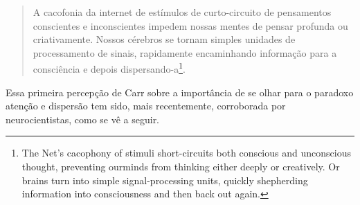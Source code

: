 \begin{quote}
    A cacofonia da internet de estímulos de curto-circuito de pensamentos conscientes e inconscientes impedem nossas mentes de pensar profunda ou criativamente. Nossos cérebros se tornam simples unidades de processamento de sinais, rapidamente encaminhando informação para a consciência e depois dispersando-a\footnote{The Net’s cacophony of stimuli short-circuits both conscious and unconscious thought, preventing ourminds from thinking either deeply or creatively. Or brains turn into simple signal-processing units, quickly shepherding information into consciousness and then back out again.}.
\end{quote}
 

Essa primeira percepção de Carr sobre a importância de se olhar para o paradoxo atenção e dispersão tem sido, mais recentemente, corroborada por neurocientistas, como se vê a seguir.